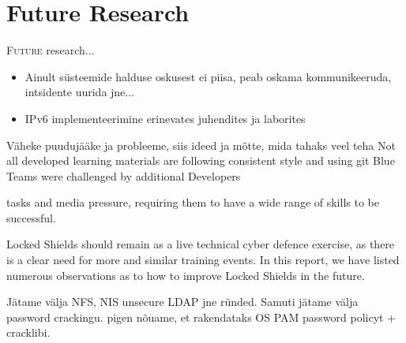 \chapter{Future Research}
\label{Future Research}

\lettrine[lraise=0.1, nindent=0em, slope=-.5em]{\color{Violet}F}{uture} research...


\begin{itemize}
\item Ainult süsteemide halduse oskusest ei piisa, peab oskama kommunikeeruda, intsidente uurida jne...
\item IPv6 implementeerimine erinevates juhendites ja laborites
\end{itemize}
{\color{red} Väheke puudujääke ja probleeme, siis ideed ja mõtte, mida tahaks veel teha
Not all developed learning materials are following consistent style and using \gls{git}
Blue Teams were challenged by additional Developers


tasks and media pressure, requiring them to have a wide range of skills to be successful. 


Locked Shields should remain as a live technical cyber defence exercise, as there is a clear need for
more and similar training events. In this report, we have listed numerous observations as to how to
improve Locked Shields in the future.

Jätame välja NFS, NIS unsecure LDAP jne ründed.
Samuti jätame välja password crackingu. pigen nõuame, et rakendataks OS PAM password policyt + cracklibi.
 }